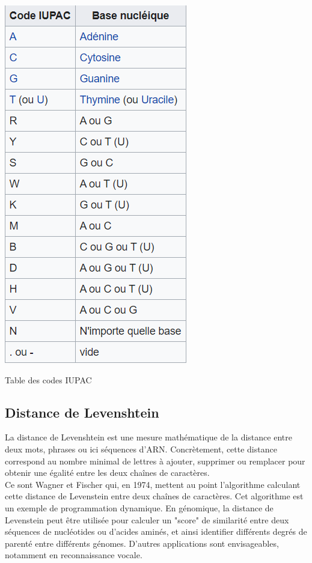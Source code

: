 \documentclass[12pt]{article}
\begin{document}
        \begin{table} [!h]
             \centering
             \includegraphics[scale = 1]{Images/Codons/nucleotides.png}
             \caption{Table des  codes IUPAC}
             \label{fig:table des codes IUPAC}
        \end{table}
        
\newpage

\subsection{Distance de Levenshtein} 



La distance de Levenshtein est une mesure mathématique de la distance entre deux mots, phrases ou ici séquences d'ARN. Concrètement, cette distance correspond au nombre minimal de lettres à ajouter, supprimer ou remplacer pour obtenir une égalité entre les deux chaînes de caractères.\\
Ce sont Wagner et Fischer qui, en 1974, mettent au point l'algorithme calculant cette distance de Levenstein entre deux chaînes de caractères. Cet algorithme est un exemple de programmation dynamique.
En génomique, la distance de Levenstein peut être utilisée pour calculer un "score" de similarité entre deux séquences de nucléotides ou d'acides aminés, et ainsi identifier différents degrés de parenté entre différents génomes. D'autres applications sont envisageables, notamment en reconnaissance vocale.\\
\end{document}
